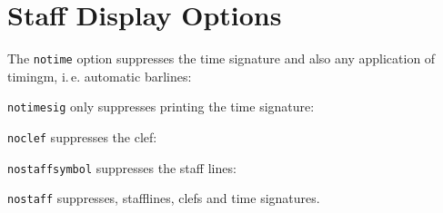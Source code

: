 \documentclass{scrartcl}
\begin{document}
\section*{Staff Display Options}

The \texttt{notime} option suppresses the time signature and also any
application of timingm, i.\,e. automatic barlines:


\texttt{notimesig} only suppresses printing the time signature:


\texttt{noclef} suppresses the clef:


\texttt{nostaffsymbol} suppresses the staff lines:


\texttt{nostaff} suppresses, stafflines, clefs and time signatures.

\end{document}
